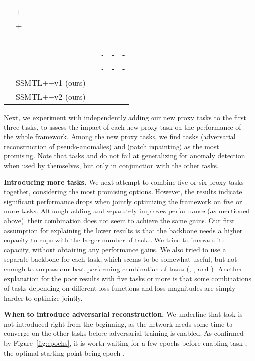 \documentclass[times,twocolumn,final,authoryear]{elsarticle}
\begin{document}
\begin{table*}[!th]
\begin{center}
\begin{tabular}{|c|l|c|c|c|c|}
& \cite{Liu-CVPR-2018} + \cite{Ristea-CVPR-2022} &  &  &  &  \\
& \cite{Liu-ICCV-2021} + \cite{Ristea-CVPR-2022} &  &  &  &  \\
& \cite{Park-WACV-2022} &  & - & - & - \\
& \cite{Yu-CVPR-2022} &  & - & - & - \\
& \cite{Zaheer-CVPR-2022} &  & - & - & - \\
\cline{2-6}
& SSMTL++v1 (ours) &  &  &  &  \\
& SSMTL++v2 (ours) &  &  &  &  \\
\hline
\end{tabular}
\end{center}
\end{table*}

Next, we experiment with independently adding our new proxy tasks to the first three tasks, to assess the impact of each new proxy task on the performance of the whole framework. Among the new proxy tasks, we find tasks  (adversarial reconstruction of pseudo-anomalies) and  (patch inpainting) as the most promising. Note that tasks  and  do not fail at generalizing for anomaly detection when used by themselves, but only in conjunction with the other tasks.

\noindent
{\bf Introducing more tasks.}
We next attempt to combine five or six proxy tasks together, considering the most promising options. However, the results indicate significant performance drops when jointly optimizing the framework on five or more tasks. Although adding  and  separately improves performance (as mentioned above), their combination does not seem to achieve the same gains. Our first assumption for explaining the lower results is that the backbone needs a higher capacity to cope with the larger number of tasks. We tried to increase its capacity, without obtaining any performance gains. We also tried to use a separate backbone for each task, which seems to be somewhat useful, but not enough to surpass our best performing combination of tasks (, ,  and ). Another explanation for the poor results with five tasks or more is that some combinations of tasks depending on different loss functions and loss magnitudes are simply harder to optimize jointly.

\noindent
{\bf When to introduce adversarial reconstruction.}
We underline that task  is not introduced right from the beginning, as the network needs some time to converge on the other tasks before adversarial training is enabled. As confirmed by Figure~\ref{fig:epochs}, it is worth waiting for a few epochs before enabling task , the optimal starting point being epoch .
\end{document}
